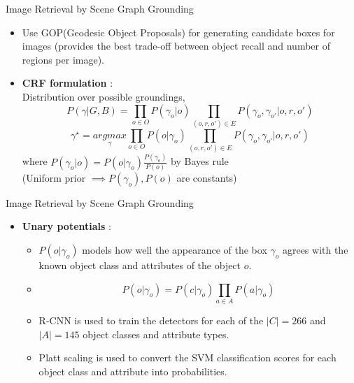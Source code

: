\documentclass{IFES-beamer}
\begin{document}
    \begin{frame}{Image Retrieval by Scene Graph Grounding}
        \begin{itemize}
            \item Use GOP(Geodesic Object Proposals)\cite{krahenbuhl2014geodesic} for generating candidate boxes for images (provides the best trade-off between object recall and number of regions per image).
            \item \textbf{CRF formulation} : \\
            Distribution over possible groundings, $$P(\gamma|G,B) = \prod_{o \in O} P(\gamma_o|o) \prod_{(o,r,o') \in E} P(\gamma_o, \gamma_{o'}|o,r,o')$$ 
            $$\gamma^{\star} = \underset{\gamma}{argmax} \prod_{o \in O} P(o|\gamma_o) \prod_{(o,r,o') \in E} P(\gamma_o, \gamma_{o'}|o,r,o')$$
            where $P(\gamma_o|o) = P(o|\gamma_o) \frac{P(\gamma_o)}{P(o)}$ by Bayes rule \\
            (Uniform prior $\implies P(\gamma_o), P(o)$ are constants)
        \end{itemize}
    \end{frame}
    
    \begin{frame}{Image Retrieval by Scene Graph Grounding}
        \begin{itemize}
            \item \textbf{Unary potentials} : 
                \begin{itemize}
                    \item $P(o | \gamma_o)$ models how well the appearance of the box $\gamma_o$ agrees with the known object class and attributes of the object $o$. 
                    \item $$P(o|\gamma_o) = P(c|\gamma_o) \prod_{a \in A} P(a|\gamma_o)$$
                    \item R-CNN is used to train the detectors for each of the $|C| = 266$ and $|A| = 145$ object classes and attribute types. 
                    \item Platt scaling is used to convert the SVM classification scores for each object class and attribute into probabilities.
                \end{itemize}
        \end{itemize}
    \end{frame}
    
\end{document}
